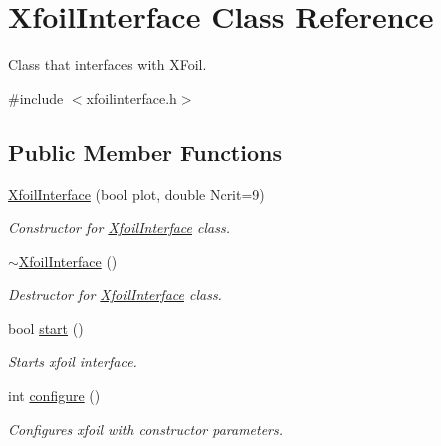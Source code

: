 \hypertarget{classXfoilInterface}{}\section{Xfoil\+Interface Class Reference}
\label{classXfoilInterface}


Class that interfaces with X\+Foil.  




{\ttfamily \#include $<$xfoilinterface.\+h$>$}

\subsection*{Public Member Functions}
\begin{DoxyCompactItemize}
\item 
\mbox{\label{classXfoilInterface_acf3d487c09b576a8730a23eb6decee57}} 
\hyperlink{classXfoilInterface_acf3d487c09b576a8730a23eb6decee57}{Xfoil\+Interface} (bool plot, double Ncrit=9)
\begin{DoxyCompactList}\small\item\em Constructor for \hyperlink{classXfoilInterface}{Xfoil\+Interface} class. \end{DoxyCompactList}\item 
\mbox{\label{classXfoilInterface_a48dc2121cd7710c73eee89643088ab7c}} 
\hyperlink{classXfoilInterface_a48dc2121cd7710c73eee89643088ab7c}{$\sim$\+Xfoil\+Interface} ()
\begin{DoxyCompactList}\small\item\em Destructor for \hyperlink{classXfoilInterface}{Xfoil\+Interface} class. \end{DoxyCompactList}\item 
bool \hyperlink{classXfoilInterface_aba502bd5accaf23d3bdf342a82d5fb7f}{start} ()
\begin{DoxyCompactList}\small\item\em Starts xfoil interface. \end{DoxyCompactList}\item 
\mbox{\label{classXfoilInterface_aedc0b9716eb07c623b9577c69ad2cc97}} 
int \hyperlink{classXfoilInterface_aedc0b9716eb07c623b9577c69ad2cc97}{configure} ()
\begin{DoxyCompactList}\small\item\em Configures xfoil with constructor parameters. \end{DoxyCompactList}\item 

\end{DoxyCompactItemize}
